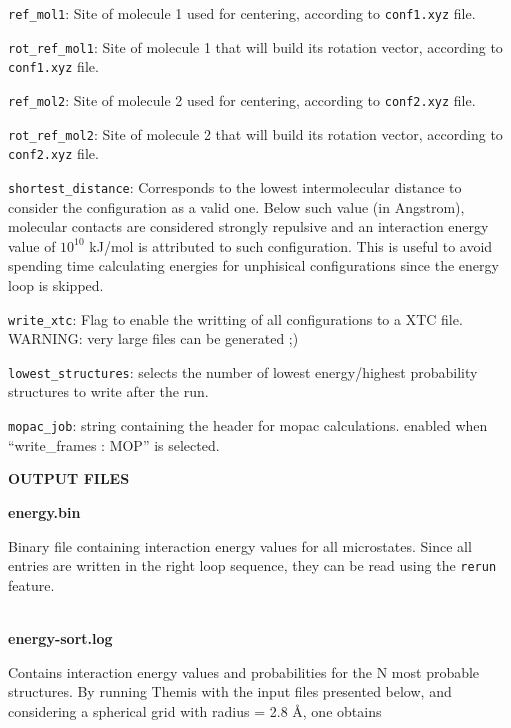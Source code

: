 \documentclass{achemso}
\begin{document}
\texttt{ref\_mol1}: Site of molecule 1 used for centering, according to
  \texttt{conf1.xyz} file. 

\texttt{rot\_ref\_mol1}: Site of molecule 1 that will build its rotation
  vector, according to \texttt{conf1.xyz} file. 

\texttt{ref\_mol2}: Site of molecule 2 used for centering, according to
  \texttt{conf2.xyz} file. 

\texttt{rot\_ref\_mol2}: Site of molecule 2 that will build its rotation
  vector, according to \texttt{conf2.xyz} file. 

\texttt{shortest\_distance}: Corresponds to the lowest intermolecular distance
  to consider the configuration as a valid one. Below such value (in Angstrom), 
  molecular contacts are considered strongly repulsive and an interaction energy 
  value of $10^{10}$ kJ/mol is attributed  to such configuration. This is useful 
  to avoid spending time calculating energies for unphisical configurations since 
  the energy loop is skipped.

\texttt{write\_xtc}: Flag to enable the writting of all configurations to
  a XTC file. WARNING: very large files can be generated ;) 
  
\texttt{lowest\_structures}: selects the number of lowest energy/highest
  probability structures to write after the run. 
  
\texttt{mopac\_job}: string containing the header for mopac calculations.
  enabled when ``write\_frames : MOP'' is selected.


\newpage

\begin{center}
  \textbf{OUTPUT FILES}
\end{center}

\textbf{energy.bin}

  Binary file containing interaction energy values for all microstates. Since
  all entries are written in the right loop sequence, they can be read using the
  \texttt{rerun} feature. \\~

\textbf{energy-sort.log}
  
  Contains interaction energy values and probabilities for the N most probable
  structures. By running Themis with the input files presented below, and
  considering a spherical grid with radius = 2.8 \AA, one obtains \\~
\end{document}
